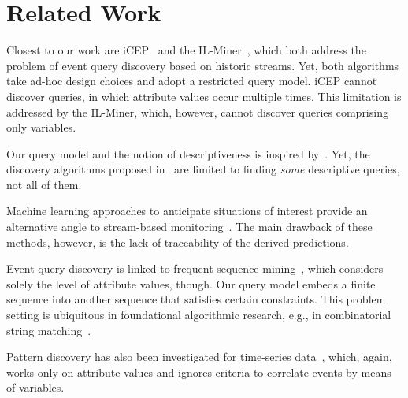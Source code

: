 \section{Related Work}
\label{sec:related_work}

Closest to our work are iCEP~\cite{icep} and the IL-Miner~\cite{ilminer},
which both address the problem of event query discovery based on historic
streams. Yet, both
algorithms take ad-hoc design choices and adopt a restricted query model.
iCEP cannot discover queries, in which attribute values
occur multiple times. This limitation is addressed by the IL-Miner, which,
however, cannot discover queries comprising only variables.

Our query model and the notion of descriptiveness is inspired
by~\cite{icdt2022,DBLP:conf/btw/Kleest-Meissner23}. Yet, the discovery
algorithms proposed in~\cite{icdt2022,DBLP:conf/btw/Kleest-Meissner23} are
limited to finding
\emph{some} descriptive queries, not all of them.


Machine learning approaches to anticipate situations of
interest provide an alternative angle to stream-based
monitoring~\cite{yanli2021,ARECEP,autoCEP}. The main drawback of these
methods,
however, is the lack of traceability of the derived
predictions.


Event query discovery is linked to frequent sequence
mining~\cite{agrawal1995,clospan,bide,DBLP:journals/csur/MabroukehE10}, which
considers solely
the level of attribute values, though. Our query model embeds a finite
sequence into
another sequence that satisfies certain
constraints. This problem setting is ubiquitous in foundational algorithmic
research, e.g., in combinatorial string
matching~\cite{DayEtAl2022,KoscheEtAl2022}.

Pattern discovery has also been investigated for
time-series data~\cite{streaming,crossmatch}, which, again, works only  on
attribute values and ignores criteria to correlate events by means of
variables.
